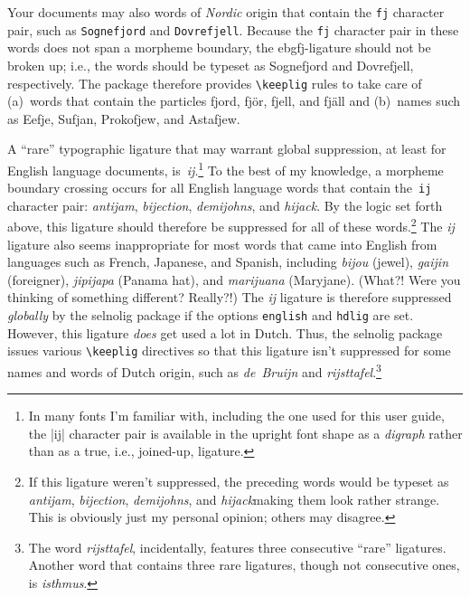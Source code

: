 \documentclass[11pt]{article}
\newcommand{\pkg}[1]{\textsf{#1}}
\newcommand{\opt}[1]{\texttt{#1}}
\newcommand{\cmmd}[1]{\texttt{\textbackslash #1}}
\begin{document}
Your documents may also words of \emph{Nordic} origin that contain the \opt{fj} character pair, such as \opt{Sognefjord} and \opt{Dovrefjell}. Because the \opt{fj} character pair in these words does not span a morpheme boundary, the {ebg\mbox{fj}}-ligature should not be broken up; i.e., the words should be typeset as {\ebg Sognefjord and Dovrefjell}, respectively. The package therefore provides \cmmd{keeplig} rules to take care of (a)~words that contain the particles {\ebg fjord, fjör, fjell, and fjäll} and (b)~names such as {\ebg Eefje, Sufjan, Prokofjew, and Astafjew}.

A \enquote{rare} typographic ligature that may warrant global suppression, at least for English language documents, is~\mbox{\emph{ij}}.\footnote{In many fonts I'm familiar with, including the one used for this user guide, the |ij| character pair is available in the upright font shape as a \emph{digraph} rather than as a true, i.e., joined-up, ligature.} To the best of my knowledge, a morpheme boundary crossing occurs for all English language words that contain the~\opt{ij} character pair: \emph{antijam}, \emph{bijection}, \emph{demijohns}, and \emph{hijack}. By the logic set forth above, this ligature should therefore be suppressed for all of these words.\footnote{If this ligature weren't suppressed, the preceding words would be typeset as \emph{ant\mbox{ij}am}, \emph{b\mbox{ij}ection}, \emph{dem\mbox{ij}ohns}, and \emph{h\mbox{ij}ack}\textemdash making them look rather strange. This is obviously just my personal opinion; others may disagree.} The \mbox{\emph{ij}} ligature also seems inappropriate for most words that came into English from languages such as French, Japanese, and Spanish, including \emph{bijou} (jewel), \emph{gaijin} (foreigner), \emph{jipijapa} (Panama hat), and \emph{marijuana} (Maryjane). (What?! Were you thinking of something different? Really?!) The \mbox{\emph{ij}} ligature is therefore suppressed \emph{globally} by the \pkg{selnolig} package if the options \opt{english} and \opt{hdlig} are set.
However, this ligature \emph{does} get used a lot in Dutch. Thus, the \pkg{selnolig} package issues various \cmmd{keeplig} directives so that this ligature isn't suppressed for some names and words of Dutch origin, such as \emph{de~Bruijn} and \emph{rijsttafel}.\footnote{The word \emph{rijsttafel}, incidentally, features three consecutive \enquote{rare} ligatures. Another word that contains three rare ligatures, though not consecutive ones, is \emph{\mbox{is}thmus}. }
\end{document}
